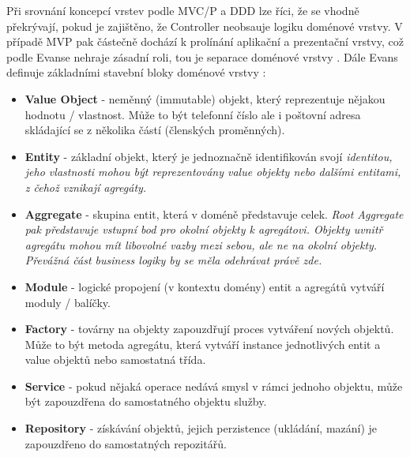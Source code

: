 Při srovnání koncepcí vrstev podle MVC/P a DDD lze říci, že se vhodně překrývají, pokud je zajištěno, že Controller neobsauje logiku doménové vrstvy. V případě MVP pak částečně dochází k prolínání aplikační a prezentační vrstvy, což podle Evanse nehraje zásadní roli, tou je separace doménové vrstvy \cite{EvansDDD}. Dále Evans definuje základními stavební bloky doménové vrstvy \cite{EvansDDD}:
\begin{itemize}
	\item \textbf{Value Object} - neměnný (immutable) objekt, který reprezentuje nějakou hodnotu / vlastnost. Může to být telefonní číslo ale i poštovní adresa skládající se z několika částí (členských proměnných).
	\item \textbf{Entity} - základní objekt, který je jednoznačně identifikován svojí \it{identitou}, jeho vlastnosti mohou být reprezentovány value objekty nebo dalšími entitami, z čehož vznikají agregáty.

	\item \textbf{Aggregate} - skupina entit, která v doméně představuje celek. \it{Root Aggregate} pak představuje vstupní bod pro okolní objekty k agregátovi. Objekty uvnitř agregátu mohou mít libovolné vazby mezi sebou, ale ne na okolní objekty. Převážná část business logiky by se měla odehrávat právě zde.
	\item \textbf{Module} - logické propojení (v kontextu domény) entit a agregátů vytváří moduly / balíčky.
	\item \textbf{Factory} - továrny na objekty zapouzdřují proces vytváření nových objektů. Může to být metoda agregátu, která vytváří instance jednotlivých entit a value objektů nebo samostatná třída.
	\item \textbf{Service} - pokud nějaká operace nedává smysl v rámci jednoho objektu, může být zapouzdřena do samostatného objektu služby.
	\item \textbf{Repository} - získávání objektů, jejich perzistence (ukládání, mazání) je zapouzdřeno do samostatných repozitářů.
\end{itemize}